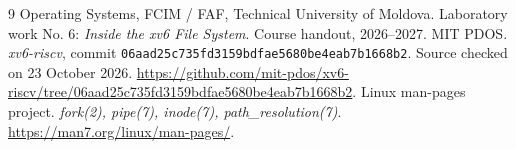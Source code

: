 \begin{thebibliography}{9}
 Operating Systems, FCIM / FAF, Technical University of Moldova.
Laboratory work No. 6: \emph{Inside the xv6 File System}. Course handout, 2026--2027.
 MIT PDOS. \emph{xv6-riscv}, commit
\texttt{06aad25c735fd3159bdfae5680be4eab7b1668b2}.
Source checked on 23 October 2026.
\url{https://github.com/mit-pdos/xv6-riscv/tree/06aad25c735fd3159bdfae5680be4eab7b1668b2}.
 Linux man-pages project. \emph{fork(2), pipe(7), inode(7), path\_resolution(7)}.
\url{https://man7.org/linux/man-pages/}.
\end{thebibliography}
